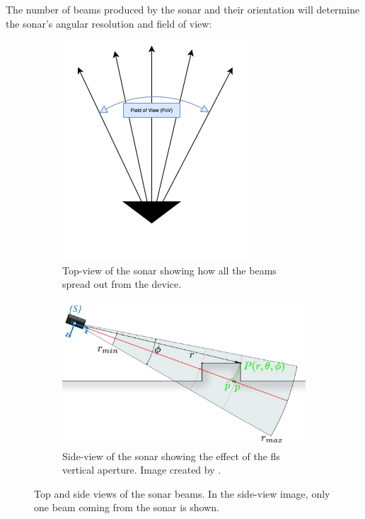 The number of beams produced by the sonar and their orientation will determine the sonar's angular resolution and field of view:
\begin{figure}[H]
    \centering
    \begin{subfigure}[b]{.35\textwidth}
        \centering
        \includegraphics[width=\textwidth]{figures/FLS-TopView.png}
        \caption{Top-view of the sonar showing how all the beams spread out from the device.}
        \label{fig:flstop}
    \end{subfigure}
    \hfill
    \begin{subfigure}[b]{.55\textwidth}
        \centering
        \includegraphics[width=\textwidth]{figures/FLS.png}
        \caption{Side-view of the sonar showing the effect of the \acrshort{fls} vertical aperture. Image created by \citeauthor{Hurtos2015} \cite{Hurtos2015}.}
        \label{fig:flsaperture}
    \end{subfigure}
    \caption{Top and side views of the sonar beams. In the side-view image, only one beam coming from the sonar is shown.}
\end{figure}


